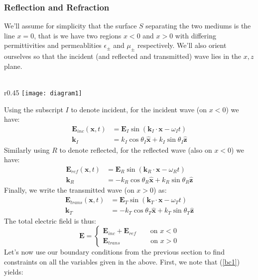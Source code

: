 \documentclass[a4paper]{article}
\numberwithin{equation}{section}
\begin{document}
\subsubsection{Reflection and Refraction}
We'll assume for simplicity that the surface $S$ separating the two mediums is the line $x=0$, that is we have two regions $x <0$ and $x>0$ with differing permittivities and permeablities $\epsilon_\pm$ and $\mu_\pm$ respectively. We'll also orient ourselves so that the incident (and reflected and transmitted) wave lies in the $x,z$ plane. \\
\\
\begin{wrapfigure}[18]{r}{0.45\textwidth}
	\texttt{[image: diagram1]}
\end{wrapfigure}
Using the subscript $I$ to denote incident, for the incident wave (on $x<0$) we have:
\begin{align}
\mathbf{E}_{inc}(\mathbf{x},t)&=\mathbf{E}_I\sin(\mathbf{k}_I \cdot \mathbf{x} - \omega_I t) \\
\mathbf{k}_I &= k_I \cos \theta_I \hat{\mathbf{x}} + k_I \sin \theta_I \hat{\mathbf{z}}
\end{align}
Similarly using $R$ to denote reflected, for the reflected wave (also on $x<0$) we have:
\begin{align}
\mathbf{E}_{ref}(\mathbf{x},t)&=\mathbf{E}_R \sin(\mathbf{k}_R \cdot \mathbf{x} - \omega_R t) \\
\mathbf{k}_R&= -k_R \cos \theta_R \hat{\mathbf{x}} + k_R \sin \theta_R \hat{\mathbf{z}}
\end{align}
Finally, we write the transmitted wave (on $x>0$) as:
\begin{align}
\mathbf{E}_{trans}(\mathbf{x},t)&=\mathbf{E}_T \sin(\mathbf{k}_T \cdot \mathbf{x} - \omega_T t) \\
\mathbf{k}_T&= -k_T \cos \theta_T \hat{\mathbf{x}} + k_T \sin \theta_T \hat{\mathbf{z}}
\end{align}
The total electric field is thus:
\begin{equation}
\mathbf{E} = 
\begin{cases} 
\mathbf{E}_{inc} + \mathbf{E}_{ref} \qquad \text{on } x<0 \\
\mathbf{E}_{trans} \qquad  \qquad \text{  on } x>0
\end{cases}
\end{equation}
Let's now use our boundary conditions from the previous section to find constraints on all the variables given in the above. First, we note that (\ref{bc1}) yields:
\end{document}
